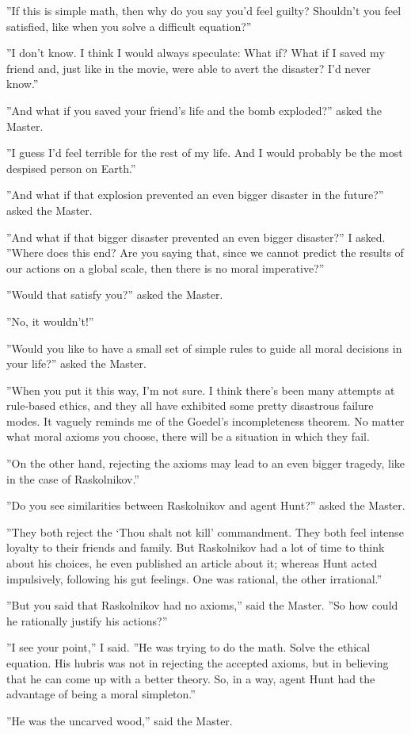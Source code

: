 \documentclass{memoir}
\begin{document}
''If this is simple math, then why do you say you'd feel guilty? Shouldn't you feel satisfied, like when you solve a difficult equation?''

''I don't know. I think I would always speculate: What if? What if I saved my friend and, just like in the movie, were able to avert the disaster? I'd never know.''

''And what if you saved your friend's life and the bomb exploded?'' asked the Master.

''I guess I'd feel terrible for the rest of my life. And I would probably be the most despised person on Earth.''

''And what if that explosion prevented an even bigger disaster in the future?'' asked the Master.

''And what if that bigger disaster prevented an even bigger disaster?'' I asked. ''Where does this end? Are you saying that, since we cannot predict the results of our actions on a global scale, then there is no moral imperative?''

''Would that satisfy you?'' asked the Master.

''No, it wouldn't!''

''Would you like to have a small set of simple rules to guide all moral decisions in your life?'' asked the Master.

''When you put it this way, I'm not sure. I think there's been many attempts at rule-based ethics, and they all have exhibited some pretty disastrous failure modes. It vaguely reminds me of the Goedel's incompleteness theorem. No matter what moral axioms you choose, there will be a situation in which they fail.

''On the other hand, rejecting the axioms may lead to an even bigger tragedy, like in the case of Raskolnikov.''

''Do you see similarities between Raskolnikov and agent Hunt?'' asked the Master.

''They both reject the `Thou shalt not kill' commandment. They both feel intense loyalty to their friends and family. But Raskolnikov had a lot of time to think about his choices, he even published an article about it; whereas Hunt acted impulsively, following his gut feelings. One was rational, the other irrational.''

''But you said that Raskolnikov had no axioms,'' said the Master. ''So how could he rationally justify his actions?''

''I see your point,'' I said. ''He was trying to do the math. Solve the ethical equation. His hubris was not in rejecting the accepted axioms, but in believing that he can come up with a better theory. So, in a way, agent Hunt had the advantage of being a moral simpleton.''

''He was the uncarved wood,'' said the Master.
\end{document}

